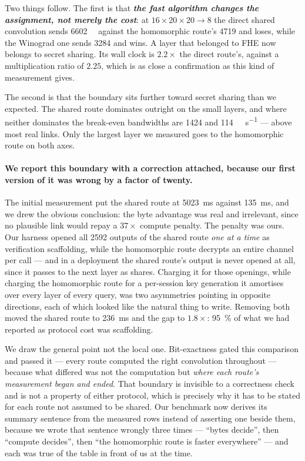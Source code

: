 \documentclass[11pt]{article}
\newcommand{\ib}[1]{\textbf{\emph{#1}}}
\begin{document}
Two things follow. The first is that \ib{the fast algorithm changes the assignment, not merely the
cost}: at $16\times20\times20 \to 8$ the direct shared convolution sends \SI{6602}{\kilo\byte}
against the homomorphic route's \num{4719} and loses, while the Winograd one sends \num{3284} and
wins. A layer that belonged to FHE now belongs to secret sharing. Its wall clock is $2.2\times$ the
direct route's, against a multiplication ratio of $2.25$, which is as close a confirmation as this
kind of measurement gives.

The second is that the boundary sits further toward secret sharing than we expected. The shared
route dominates outright on the small layers, and where neither dominates the break-even bandwidths
are \num{1424} and \SI{114}{\mega\bit\per\second} --- above most real links. Only the largest layer
we measured goes to the homomorphic route on both axes.

\paragraph{We report this boundary with a correction attached, because our first version of it was
wrong by a factor of twenty.} The initial measurement put the shared route at
\SI{5023}{\milli\second} against \SI{135}{\milli\second}, and we drew the obvious conclusion: the
byte advantage was real and irrelevant, since no plausible link would repay a $37\times$ compute
penalty. The penalty was ours. Our harness opened all \num{2592} outputs of the shared route
\emph{one at a time} as verification scaffolding, while the homomorphic route decrypts an entire
channel per call --- and in a deployment the shared route's output is never opened at all, since it
passes to the next layer as shares. Charging it for those openings, while charging the homomorphic
route for a per-session key generation it amortises over every layer of every query, was two
asymmetries pointing in opposite directions, each of which looked like the natural thing to write.
Removing both moved the shared route to \SI{236}{\milli\second} and the gap to $1.8\times$:
\SI{95}{\percent} of what we had reported as protocol cost was scaffolding.

We draw the general point not the local one. Bit-exactness gated this comparison and passed
it --- every route computed the right convolution throughout --- because what differed was not the
computation but \emph{where each route's measurement began and ended}. That boundary is invisible
to a correctness check and is not a property of either protocol, which is precisely why it has to
be stated for each route not assumed to be shared. Our benchmark now derives its summary
sentence from the measured rows instead of asserting one beside them, because we wrote that
sentence wrongly three times --- ``bytes decide'', then ``compute decides'', then ``the homomorphic
route is faster everywhere'' --- and each was true of the table in front of us at the time.
\end{document}
